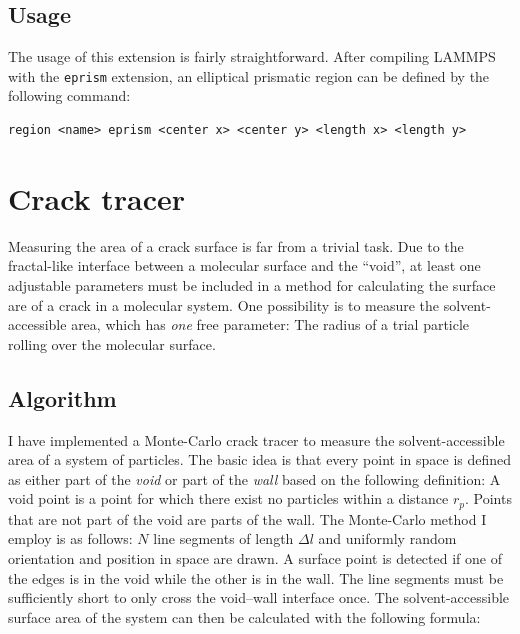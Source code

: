 \subsection{Usage}
The usage of this extension is fairly straightforward. After compiling LAMMPS with the {\tt eprism} extension, an elliptical prismatic region can be defined by the following command:
\begin{lstlisting}[language=LammpsInput]
region <name> eprism <center x> <center y> <length x> <length y>
\end{lstlisting}

\section{Crack tracer}
Measuring the area of a crack surface is far from a trivial task. Due to the fractal-like interface between a molecular surface and the ``void'', at least one adjustable parameters must be included in a method for calculating the surface are of a crack in a molecular system. One possibility is to measure the solvent-accessible area, which has \emph{one} free parameter: The radius of a trial particle rolling over the molecular surface. 


\subsection{Algorithm}
I have implemented a Monte-Carlo crack tracer to measure the solvent-accessible area of a system of particles. The basic idea is that every point in space is defined as either part of the \emph{void} or part of the \emph{wall} based on the following definition: A void point is a point for which there exist no particles within a distance $r_p$. Points that are not part of the void are parts of the wall. The Monte-Carlo method I employ is as follows: $N$ line segments of length $\Delta l$ and uniformly random orientation and position in space are drawn. A surface point is detected if one of the edges is in the void while the other is in the wall. The line segments must be sufficiently short to only cross the void--wall interface once. The solvent-accessible surface area of the system can then be calculated with the following formula:

